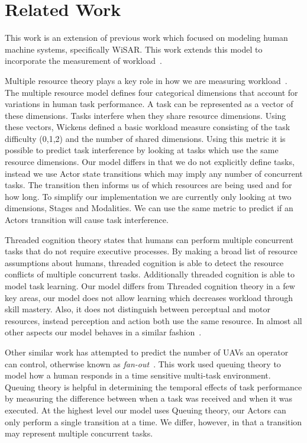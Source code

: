 \section{Related Work}

This work is an extension of previous work which focused on modeling human
machine systems, specifically WiSAR.  This work extends this model to
incorporate the measurement of workload~\cite{gledhill2013modelinguas}.

Multiple resource theory plays a key role in how we are measuring workload~\cite{wickens2002multiple}. The multiple resource model defines four categorical dimensions that
account for variations in human task performance.  A task can be represented as a vector of these dimensions.  Tasks interfere when they share resource dimensions.  Using these vectors, Wickens defined a basic workload measure consisting of the task difficulty (0,1,2) and the number of shared dimensions.  Using this metric it is possible to predict task interference by looking at tasks which use the same resource dimensions.  Our model differs in that we do not explicitly define tasks, instead we use Actor state transitions which may imply any number of concurrent tasks.  The transition then informs us of which resources are being used and for how long.  To simplify our implementation we are currently only looking at two dimensions, Stages and Modalities.  We can use the same metric to predict if an Actors transition will cause task interference.

Threaded cognition theory states that humans can perform
multiple concurrent tasks that do not require executive processes.  By making a
broad list of resource assumptions about humans, threaded cognition is able to
detect the resource conflicts of multiple concurrent tasks.  Additionally
threaded cognition is able to model task learning.  Our model differs from
Threaded cognition theory in a few key areas, our model does not allow learning
which decreases workload through skill mastery.  Also, it does not distinguish
between perceptual and motor resources, instead perception and action both use
the same resource.  In almost all other aspects our model behaves in a similar fashion~\cite{salvucci2008threaded}.

Other similar work has attempted to predict the number of UAVs an operator can
control, otherwise known as {\em fan-out}~\cite{cummings2007predicting,OlsenWood2004,CrandallEtAl2005}.  This work used queuing theory
to model how a human responds in a time sensitive multi-task environment.  Queuing theory is helpful in determining the temporal effects of task performance by measuring the difference between when a task was received and when it was executed.  At the highest level our model uses Queuing theory, our Actors can only perform a single transition at a time.  We differ, however, in that a transition may represent multiple concurrent tasks.

